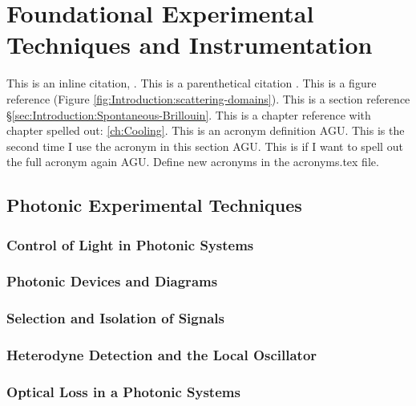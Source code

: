 \chapter{Foundational Experimental Techniques and Instrumentation}
\label{ch:Experimental}
\acresetall

This is an inline citation, \cite{boyd2020nonlinear}. This is a parenthetical citation \citep{boyd2020nonlinear}. This is a figure reference (Figure \ref{fig:Introduction:scattering-domains}). This is a section reference \S\ref{sec:Introduction:Spontaneous-Brillouin}. This is a chapter reference with chapter spelled out: \autoref{ch:Cooling}. This is an acronym definition \ac{AGU}. This is the second time I use the acronym in this section \ac{AGU}. This is if I want to spell out the full acronym again \acf{AGU}. Define new acronyms in the acronyms.tex file.


\section{Photonic Experimental Techniques}
\label{sec:Experimental:Experimental Techniques}


\subsection{Control of Light in Photonic Systems}
\label{subsec:Experimental:Techniques:Control}


\subsection{Photonic Devices and Diagrams}
\label{subsec:Experimental:Techniques:Diagrams}


\subsection{Selection and Isolation of Signals}
\label{subsec:Experimental:Techniques:Signals}


\subsection{Heterodyne Detection and the Local Oscillator}
\label{subsec:Experimental:Techniques:Heterodyne}


\subsection{Optical Loss in a Photonic Systems}
\label{subsec:Experimental:Techniques:Loss}


